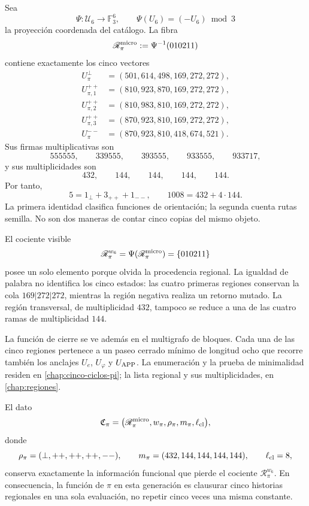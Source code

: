 Sea
\[
 \Psi:\mathcal U_6\longrightarrow\mathbb F_3^6,
 \qquad
 \Psi(U_6)=(-U_6)\bmod3
\]
la proyección coordenada del catálogo. La fibra
\[
 \mathscr R_\pi^{\rm micro}
 :=\Psi^{-1}(010211)
\]
contiene exactamente los cinco vectores
\[
\begin{aligned}
U_\pi^\perp&=(501,614,498,169,272,272),\\
U_{\pi,1}^{++}&=(810,923,870,169,272,272),\\
U_{\pi,2}^{++}&=(810,983,810,169,272,272),\\
U_{\pi,3}^{++}&=(870,923,810,169,272,272),\\
U_\pi^{--}&=(870,923,810,418,674,521).
\end{aligned}
\]
Sus firmas multiplicativas son
\[
555555,\qquad339555,\qquad393555,\qquad933555,\qquad933717,
\]
y sus multiplicidades son
\[
432,\qquad144,\qquad144,\qquad144,\qquad144.
\]
Por tanto,
\[
\boxed{
5=1_\perp+3_{++}+1_{--},
\qquad
1008=432+4\cdot144.}
\]
La primera identidad clasifica funciones de orientación; la segunda cuenta
rutas semilla. No son dos maneras de contar cinco copias del mismo objeto.

El cociente visible
\[
 \mathscr R_\pi^{w_6}
 =\Psi(\mathscr R_\pi^{\rm micro})
 =\{010211\}
\]
posee un solo elemento porque olvida la procedencia regional. La igualdad de
palabra no identifica los cinco estados: las cuatro primeras regiones
conservan la cola \(169|272|272\), mientras la región negativa realiza un
retorno mutado. La región transversal, de multiplicidad \(432\), tampoco se
reduce a una de las cuatro ramas de multiplicidad \(144\).

La función de cierre se ve además en el multigrafo de bloques. Cada una de
las cinco regiones pertenece a un paseo cerrado mínimo de longitud ocho que
recorre también los anclajes \(U_e\), \(U_\varphi\) y \(U_{\rm APP}\).
La enumeración y la prueba de minimalidad residen en
\cref{chap:cinco-ciclos-pi}; la lista regional y sus multiplicidades, en
\cref{chap:regiones}.

\begin{proposition}
\label{prop:paquete-clausura-pi-rev6}
El dato
\[
 \mathfrak C_\pi=
 \bigl(
 \mathscr R_\pi^{\rm micro},
 w_\pi,
 \rho_\pi,
 m_\pi,
 \ell_{\rm cl}
 \bigr),
\]
donde
\[
\rho_\pi=(\perp,++ ,++ ,++ ,--),\qquad
m_\pi=(432,144,144,144,144),\qquad
\ell_{\rm cl}=8,
\]
conserva exactamente la información funcional que pierde el cociente
\(\mathscr R_\pi^{w_6}\). En consecuencia, la función de \(\pi\) en esta
generación es clausurar cinco historias regionales en una sola evaluación,
no repetir cinco veces una misma constante.
\end{proposition}

